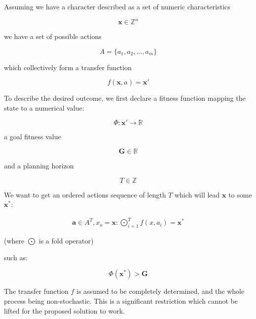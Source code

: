 \documentclass[12pt, a4paper]{report}
\begin{document}
	Assuming we have a character described as a set of numeric characteristics
	
	\begin{equation}\label{definitions:attributes-amount}
		\mathbf{x} \in \mathbb{Z}^n
	\end{equation}
	
	we have a set of possible actions
	
	\begin{equation}\label{definitions:actions-amount}
		A = \{a_1, a_2,\ldots, a_m\}
	\end{equation}
	
	which collectively form a transfer function
	
	\begin{equation}\label{definitions:transfer-function}
		f(\mathbf{x}, a) = \mathbf{x}'
	\end{equation}

	To describe the desired outcome, we first declare a fitness function mapping the state to a numerical value:
	
	\begin{equation}
		\Phi : \mathbf{x}' \rightarrow \mathbb{R}
	\end{equation} 
	
	a goal fitness value 
	
	\begin{equation}
		\mathbf{G} \in \mathbb{R}
	\end{equation}
	
	and a planning horizon
	
	\begin{equation}
		T \in \mathbb{Z}
	\end{equation}
	
	We want to get an ordered actions sequence of length $T$ which will lead $\mathbf{x}$ to some $\mathbf{x}^*$:
	
	\begin{eqnarray}\label{definitions:fold}
		\mathbf{a} \in A^T, x_o = \mathbf{x}: \bigodot_{i=1}^{T} f(x, a_i) = \mathbf{x}^*
	\end{eqnarray}
	
	(where $\bigodot$ is a fold operator)
	
	such as:
	
	\begin{equation}
		\Phi(\mathbf{x}^*) > \mathbf{G}
	\end{equation}
	
	The transfer function $f$ is assumed to be completely determined, and the whole process being non-stochastic. This is a significant restriction which cannot be lifted for the proposed solution to work.
\end{document}
